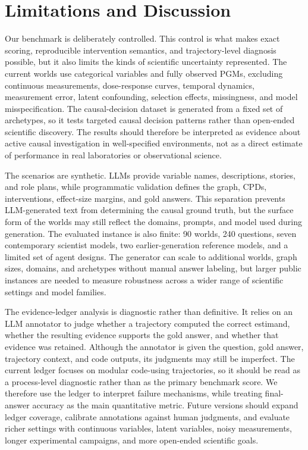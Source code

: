 \documentclass{article}
\begin{document}
\section{Limitations and Discussion}
\label{sec:limitations}

Our benchmark is deliberately controlled.
This control is what makes exact scoring, reproducible intervention semantics, and trajectory-level diagnosis possible, but it also limits the kinds of scientific uncertainty represented.
The current worlds use categorical variables and fully observed PGMs, excluding continuous measurements, dose-response curves, temporal dynamics, measurement error, latent confounding, selection effects, missingness, and model misspecification.
The causal-decision dataset is generated from a fixed set of archetypes, so it tests targeted causal decision patterns rather than open-ended scientific discovery.
The results should therefore be interpreted as evidence about active causal investigation in well-specified environments, not as a direct estimate of performance in real laboratories or observational science.

The scenarios are synthetic.
LLMs provide variable names, descriptions, stories, and role plans, while programmatic validation defines the graph, CPDs, interventions, effect-size margins, and gold answers.
This separation prevents LLM-generated text from determining the causal ground truth, but the surface form of the worlds may still reflect the domains, prompts, and model used during generation.
The evaluated instance is also finite: 90 worlds, 240 questions, seven contemporary scientist models, two earlier-generation reference models, and a limited set of agent designs.
The generator can scale to additional worlds, graph sizes, domains, and archetypes without manual answer labeling, but larger public instances are needed to measure robustness across a wider range of scientific settings and model families.

The evidence-ledger analysis is diagnostic rather than definitive.
It relies on an LLM annotator to judge whether a trajectory computed the correct estimand, whether the resulting evidence supports the gold answer, and whether that evidence was retained.
Although the annotator is given the question, gold answer, trajectory context, and code outputs, its judgments may still be imperfect.
The current ledger focuses on modular code-using trajectories, so it should be read as a process-level diagnostic rather than as the primary benchmark score.
We therefore use the ledger to interpret failure mechanisms, while treating final-answer accuracy as the main quantitative metric.
Future versions should expand ledger coverage, calibrate annotations against human judgments, and evaluate richer settings with continuous variables, latent variables, noisy measurements, longer experimental campaigns, and more open-ended scientific goals.
\end{document}

